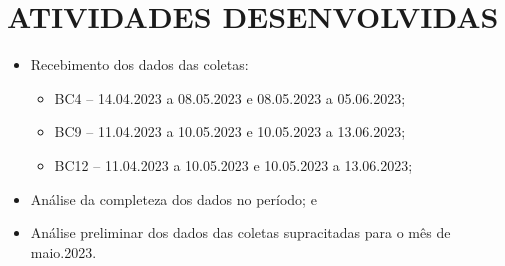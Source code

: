 \section{ATIVIDADES DESENVOLVIDAS}

\begin{itemize}
    \item Recebimento dos dados das coletas:
        \begin{itemize}
            \item BC4 – 14.04.2023 a 08.05.2023 e 08.05.2023 a 05.06.2023;
            \item BC9 – 11.04.2023 a 10.05.2023 e 10.05.2023 a 13.06.2023; 
            \item BC12 – 11.04.2023 a 10.05.2023 e 10.05.2023 a 13.06.2023;
        \end{itemize}
    \item Análise da completeza dos dados no período; e
    \item Análise preliminar dos dados das coletas supracitadas para o mês de maio.2023.
\end{itemize}
